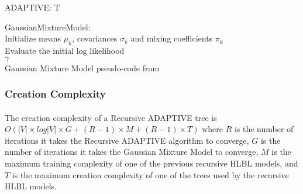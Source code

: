 \begin{algorithm}
\SetAlgoLined
ADAPTIVE:
\Return T
\end{algorithm}

\begin{algorithm} \label{code:GMM}
\SetAlgoLined
GaussianMixtureModel:
\\
Initialize means $\mu_k$, covariances $\sigma_k$ and mixing coefficients $\pi_k$
\\Evaluate the initial log likelihood
\\
\Return $\gamma$
\\
Gaussian Mixture Model pseudo-code from \cite{Bishop2006}
\end{algorithm} 

\subsubsection{Creation Complexity}
\paragraph{}
The creation complexity of a Recursive ADAPTIVE tree is $O ( |V| \times log|V| \times G + (R-1)\times M + (R-1)\times T)$ where $R$ is the number of iterations it takes the Recursive ADAPTIVE algorithm to converge, $G$ is the number of iterations it takes the Gaussian Mixture Model to converge, $M$ is the maximum training complexity of one of the previous recursive HLBL models, and $T$ is the maximum creation complexity of one of the trees used by the recursive HLBL models. 

